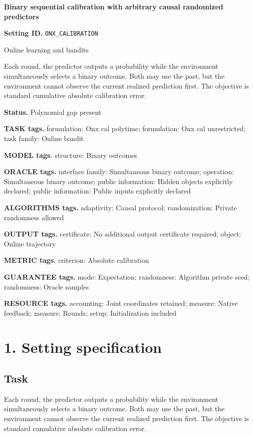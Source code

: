 \documentclass[10pt,a4paper]{article}
\begin{document}
\raggedright

{\LARGE\bfseries\sffamily\color{AtlasNavy} Binary sequential calibration with arbitrary causal randomized predictors\par}\vspace{5pt}
\textbf{Setting ID.} \texttt{ONX\_\allowbreak{}CALIBRATION}

Online learning and bandits

Each round, the predictor outputs a probability while the environment simultaneously selects a binary outcome. Both may use the past, but the environment cannot observe the current realized prediction first. The objective is standard cumulative absolute calibration error.

\textbf{Status.} Polynomial gap present

\textbf{TASK tags.} formulation: Onx cal polytime; formulation: Onx cal unrestricted; task family: Online bandit

\textbf{MODEL tags.} structure: Binary outcomes

\textbf{ORACLE tags.} interface family: Simultaneous binary outcome; operation: Simultaneous binary outcome; public information: Hidden objects explicitly declared; public information: Public inputs explicitly declared

\textbf{ALGORITHMS tags.} adaptivity: Causal protocol; randomization: Private randomness allowed

\textbf{OUTPUT tags.} certificate: No additional output certificate required; object: Online trajectory

\textbf{METRIC tags.} criterion: Absolute calibration

\textbf{GUARANTEE tags.} mode: Expectation; randomness: Algorithm private seed; randomness: Oracle samples

\textbf{RESOURCE tags.} accounting: Joint coordinates retained; measure: Native feedback; measure: Rounds; setup: Initialization included

\section{1. Setting specification}
\subsection{Task}
Each round, the predictor outputs a probability while the environment simultaneously selects a binary outcome. Both may use the past, but the environment cannot observe the current realized prediction first. The objective is standard cumulative absolute calibration error.
\end{document}
